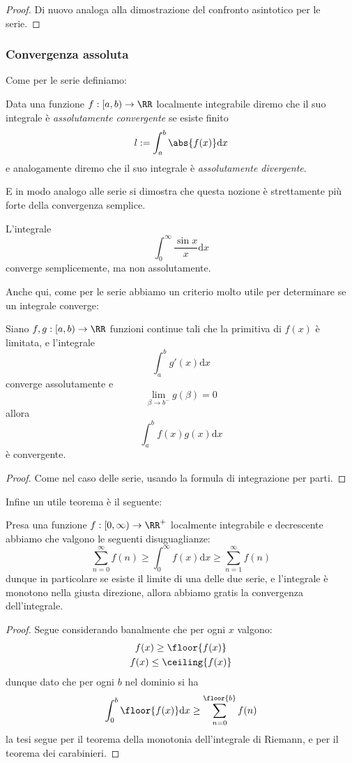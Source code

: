 \documentclass[11pt]{scrartcl}
\newcommand{\dif}{\text{d}}
\begin{document}
	\begin{proof}
		Di nuovo analoga alla dimostrazione del confronto asintotico per le serie.
	\end{proof}
	\subsubsection{Convergenza assoluta}
	Come per le serie definiamo:
	\begin{definition}
		Data una funzione $f:[a,b)\to\RR$ localmente integrabile diremo che il suo integrale è \textit{assolutamente convergente} se esiste finito
		$$l:=\int_a^b\abs{f(x)}\dif x$$
		e analogamente diremo che il suo integrale è \textit{assolutamente divergente}.
	\end{definition}
	E in modo analogo alle serie si dimostra che questa nozione è strettamente più forte della convergenza semplice.
	\begin{example}
		L'integrale
		$$\int_0^\infty \frac{\sin x}{x}\dif x$$
		converge semplicemente, ma non assolutamente.
	\end{example}
	Anche qui, come per le serie abbiamo un criterio molto utile per determinare se un integrale converge:
	\begin{theorem}
		Siano $f,g:[a,b)\to\RR$ funzioni continue tali che la primitiva di $f(x)$ è limitata, e l'integrale 
		$$\int_a^b g'(x)\dif x$$
		converge assolutamente e 
		$$\lim_{\beta\to b^-}g(\beta)=0$$
		allora 
		$$\int_a^b f(x)g(x)\dif x$$
		è convergente.
	\end{theorem}
	\begin{proof}
		Come nel caso delle serie, usando la formula di integrazione per parti.
	\end{proof}
	Infine un utile teorema è il seguente:
	\begin{theorem}
		Presa una funzione $f:[0,\infty)\to\RR^+$ localmente integrabile e decrescente abbiamo che valgono le seguenti disuguaglianze:
		$$\sum_{n=0}^{\infty}f(n)\ge \int_0^\infty f(x)\dif x \ge \sum_{n=1}^{\infty}f(n)$$
		dunque in particolare se esiste il limite di una delle due serie, e l'integrale è monotono nella giusta direzione, allora abbiamo gratis la convergenza dell'integrale. 
	\end{theorem}
	\begin{proof}
		Segue considerando banalmente che per ogni $x$ valgono:
		\begin{gather*}
			f(x)\ge \floor{f(x)} \\
			f(x)\le \ceiling{f(x)}
		\end{gather*}
		dunque dato che per ogni $b$ nel dominio si ha
		$$\int_0^b\floor{f(x)}\dif x\ge \sum_{n=0}^{\floor{b}}f(n)$$
		la tesi segue per il teorema della monotonia dell'integrale di Riemann, e per il teorema dei carabinieri.
	\end{proof}
\end{document}
